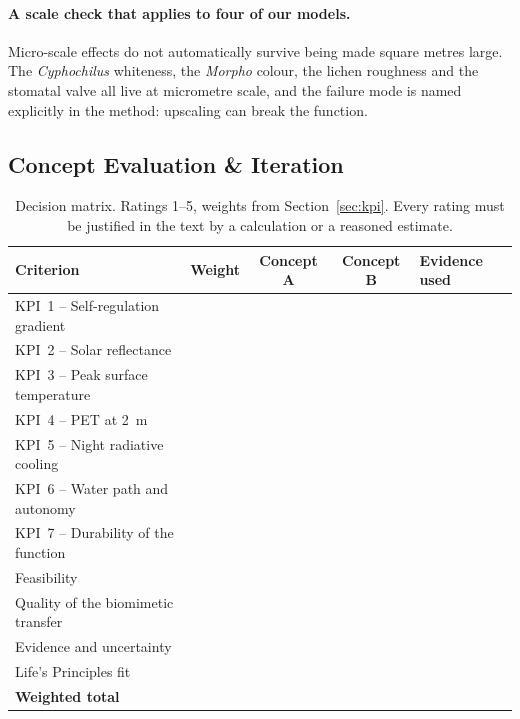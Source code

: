\paragraph{A scale check that applies to four of our models.} Micro-scale
effects do not automatically survive being made square metres large. The
\emph{Cyphochilus} whiteness, the \emph{Morpho} colour, the lichen roughness and
the stomatal valve all live at micrometre scale, and the failure mode is named
explicitly in the method: upscaling can break the function. 

\subsection{Concept Evaluation \& Iteration}
\label{sec:evaluation}

\begin{table}[htbp]
\centering
\caption{Decision matrix. Ratings 1--5, weights from
Section~\ref{sec:kpi}. Every rating must be justified in the text by a
calculation or a reasoned estimate.}
\label{tab:decision}
\renewcommand{\arraystretch}{1.25}
\small
\begin{tabularx}{\textwidth}{L{5.2cm} c c c X}
\toprule
\textbf{Criterion} & \textbf{Weight} & \textbf{Concept A} & \textbf{Concept B} & \textbf{Evidence used} \\
\midrule
KPI~1 -- Self-regulation gradient   & \todo{} & \todo{} & \todo{} & \todo{} \\
KPI~2 -- Solar reflectance          & \todo{} & \todo{} & \todo{} & \todo{} \\
KPI~3 -- Peak surface temperature   & \todo{} & \todo{} & \todo{} & \todo{} \\
KPI~4 -- PET at \qty{2}{\metre}     & \todo{} & \todo{} & \todo{} & \todo{} \\
KPI~5 -- Night radiative cooling    & \todo{} & \todo{} & \todo{} & \todo{} \\
KPI~6 -- Water path and autonomy    & \todo{} & \todo{} & \todo{} & \todo{} \\
KPI~7 -- Durability of the function & \todo{} & \todo{} & \todo{} & \todo{} \\
\midrule
Feasibility                          & \todo{} & \todo{} & \todo{} & \todo{} \\
Quality of the biomimetic transfer   & \todo{} & \todo{} & \todo{} & \todo{} \\
Evidence and uncertainty             & \todo{} & \todo{} & \todo{} & \todo{} \\
Life's Principles fit                & \todo{} & \todo{} &  \\
\midrule
\textbf{Weighted total}              &         & \todo{} & \todo{} & \\
\bottomrule
\end{tabularx}
\end{table}


